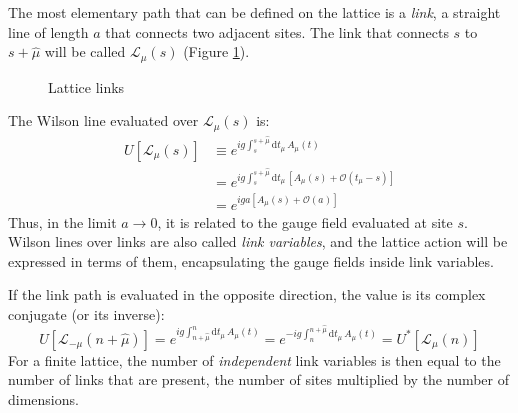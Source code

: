 The most elementary path that can be defined on the lattice is a \emph{link},
\ie a straight line of length $a$ that connects two adjacent sites.
The link that connects $s$ to $s+\hat\mu$ will be called $\mathcal L_\mu(s)$ (Figure \ref{fig:links}).
\begin{figure}[!htb]
    \centering
    \caption{Lattice links}
    \label{fig:links}
\end{figure}

The Wilson line evaluated over $\mathcal L_\mu(s)$ is:
\begin{equation}\label{eq:link}
    \begin{aligned}
        U[\mathcal L_{\mu}(s)] &\equiv e^{ig\int_s^{s+\hat\mu}\mathrm dt_\mu\,A_\mu(t)} \\
                       &= e^{ig\int_s^{s+\hat\mu}\mathrm dt_\mu\,\left[A_\mu(s) + \mathcal O\left(t_\mu-s\right)\right]} \\
                       &= e^{iga\left[A_\mu(s) + \mathcal O\left(a\right)\right]}
    \end{aligned}
\end{equation}
Thus, in the limit $a \to 0$, it is related to the gauge field evaluated at site $s$.
Wilson lines over links are also called \emph{link variables}, and the lattice action will be expressed in terms of them,
encapsulating the gauge fields inside link variables.

If the link path is evaluated in the opposite direction, the value is its complex conjugate (or its inverse):
\[
    U[\mathcal L_{-\mu}(n+\hat\mu)] = e^{ig\int^n_{n+\hat\mu}\mathrm dt_\mu\,A_\mu(t)}
                                        = e^{-ig\int_n^{n+\hat\mu}\mathrm dt_\mu\,A_\mu(t)} = U^*[\mathcal L_{\mu}(n)]
\]
For a finite lattice, the number of \emph{independent} link variables is then equal to the number of links that are present,
\ie the number of sites multiplied by the number of dimensions.

